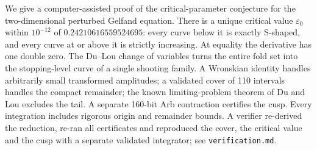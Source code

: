 \documentclass[11pt,a4paper]{report}
\begin{document}
\makepapertitle
\begin{paperabstract}
We give a computer-assisted proof of the critical-parameter conjecture for the
two-dimensional perturbed Gelfand equation. There is a unique critical value
$\varepsilon_0$ within $10^{-12}$ of $0.24210616559524695$: every curve below it
is exactly S-shaped, and every curve at or above it is strictly increasing.
At equality the derivative has one double zero. The Du--Lou change of variables
turns the entire fold set into the stopping-level curve of a single shooting
family. A Wronskian identity handles arbitrarily small transformed amplitudes; a
validated cover of 110 intervals handles the compact remainder; the known
limiting-problem theorem of Du and Lou excludes the tail. A separate 160-bit Arb
contraction certifies the cusp. Every integration includes rigorous origin and
remainder bounds. A verifier re-derived the reduction, re-ran all
certificates and reproduced the cover, the critical value and the cusp with a
separate validated integrator; see \texttt{verification.md}.
\end{paperabstract}
\end{document}
